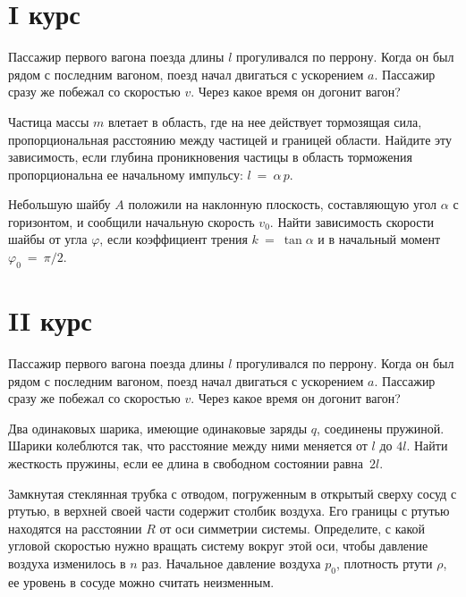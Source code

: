 \section{I курс}

\AddProb Пассажир первого вагона поезда длины $l$ прогуливался по перрону. Когда он был рядом с последним вагоном, поезд начал двигаться с ускорением $a$. 
Пассажир сразу же побежал со скоростью $v$. Через какое время он догонит вагон?

\AddProb Частица массы $m$ влетает в область, где на нее действует тормозящая сила, пропорциональная расстоянию между частицей и границей области. 
Найдите эту зависимость, если глубина проникновения частицы в область торможения пропорциональна ее начальному импульсу: $l~=~\alpha\,p$.

\AddProb Небольшую шайбу $A$ положили на наклонную плоскость, составляющую угол $\alpha$ с горизонтом, и сообщили начальную скорость $v_0$. 
Найти зависимость скорости шайбы от угла $\varphi$, если коэффициент трения $k~=~ \tan \alpha$ и в начальный момент $\varphi_0~=~\pi/2$.


\section{II курс}

\AddProb Пассажир первого вагона поезда длины $l$ прогуливался по перрону. Когда он был рядом с последним вагоном, поезд начал двигаться с ускорением $a$. 
Пассажир сразу же побежал со скоростью $v$. Через какое время он догонит вагон?

\AddProb Два одинаковых шарика, имеющие одинаковые заряды $q$, соединены пружиной. Шарики колеблются так, 
что расстояние между ними меняется от $l$ до $4l$. Найти жесткость пружины, если ее длина в свободном состоянии равна~$2l$.

\AddProb Замкнутая стеклянная трубка с отводом, погруженным в открытый сверху сосуд с ртутью, в верхней своей части содержит столбик воздуха. 
Его границы с ртутью находятся на расстоянии $R$ от оси симметрии системы. Определите, с какой угловой скоростью нужно вращать систему вокруг этой оси, 
чтобы давление воздуха изменилось в $n$ раз. Начальное давление воздуха $p_0$, плотность ртути $\rho$, ее уровень в сосуде можно считать неизменным.